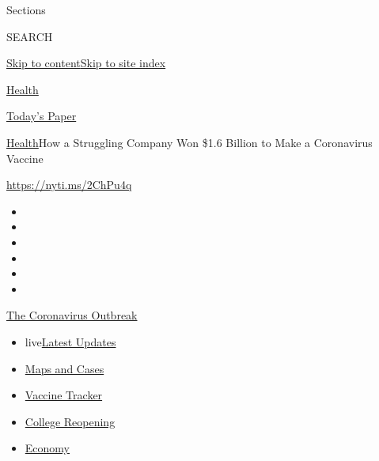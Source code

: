 Sections

SEARCH

\protect\hyperlink{site-content}{Skip to
content}\protect\hyperlink{site-index}{Skip to site index}

\href{https://www.nytimes.com/section/health}{Health}

\href{https://myaccount.nytimes.com/auth/login?response_type=cookie\&client_id=vi}{}

\href{https://www.nytimes.com/section/todayspaper}{Today's Paper}

\href{/section/health}{Health}\textbar{}How a Struggling Company Won
\$1.6 Billion to Make a Coronavirus Vaccine

\url{https://nyti.ms/2ChPu4q}

\begin{itemize}
\item
\item
\item
\item
\item
\item
\end{itemize}

\href{https://www.nytimes.com/news-event/coronavirus?action=click\&pgtype=Article\&state=default\&region=TOP_BANNER\&context=storylines_menu}{The
Coronavirus Outbreak}

\begin{itemize}
\tightlist
\item
  live\href{https://www.nytimes.com/2020/08/04/world/coronavirus-cases.html?action=click\&pgtype=Article\&state=default\&region=TOP_BANNER\&context=storylines_menu}{Latest
  Updates}
\item
  \href{https://www.nytimes.com/interactive/2020/us/coronavirus-us-cases.html?action=click\&pgtype=Article\&state=default\&region=TOP_BANNER\&context=storylines_menu}{Maps
  and Cases}
\item
  \href{https://www.nytimes.com/interactive/2020/science/coronavirus-vaccine-tracker.html?action=click\&pgtype=Article\&state=default\&region=TOP_BANNER\&context=storylines_menu}{Vaccine
  Tracker}
\item
  \href{https://www.nytimes.com/2020/08/02/us/covid-college-reopening.html?action=click\&pgtype=Article\&state=default\&region=TOP_BANNER\&context=storylines_menu}{College
  Reopening}
\item
  \href{https://www.nytimes.com/live/2020/08/04/business/stock-market-today-coronavirus?action=click\&pgtype=Article\&state=default\&region=TOP_BANNER\&context=storylines_menu}{Economy}
\end{itemize}

